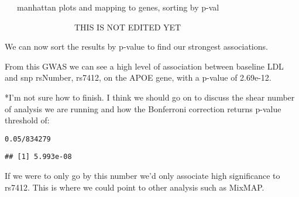 \documentclass[11pt]{article}\usepackage[]{graphicx}\usepackage[]{color}
\makeatletter
\newcommand{\hlnum}[1]{\textcolor[rgb]{0.686,0.059,0.569}{#1}}%
\newcommand{\hlopt}[1]{\textcolor[rgb]{0,0,0}{#1}}%
\newenvironment{kframe}{%
 \def\at@end@of@kframe{}%
 \ifinner\ifhmode%
  \def\at@end@of@kframe{\end{minipage}}%
  \begin{minipage}{\columnwidth}%
 \fi\fi%
 \def\FrameCommand##1{\hskip\@totalleftmargin \hskip-\fboxsep
 \colorbox{shadecolor}{##1}\hskip-\fboxsep
     \hskip-\linewidth \hskip-\@totalleftmargin \hskip\columnwidth}%
 \MakeFramed {\advance\hsize-\width
   \@totalleftmargin\z@ \linewidth\hsize
   \@setminipage}}%
 {\par\unskip\endMakeFramed%
 \at@end@of@kframe}
\newenvironment{knitrout}{}{} %
\makeatother
\begin{document}
~~~manhattan plots and mapping to genes, sorting by p-val



\newpage

~~~~~~~~~~~~~~~~~THIS IS NOT EDITED YET~~~~~~~~~~~~~~~~~~~~~

We can now sort the results by p-value to find our strongest associations.


From this GWAS we can see a high level of association between baseline LDL and snp rsNumber, rs7412, on the APOE gene, with a p-value of 2.69e-12.

*I'm not sure how to finish.  I think we should go on to discuss the shear number of analysis we are running and how the Bonferroni correction returns p-value threshold of:
\begin{knitrout}
\color{fgcolor}\begin{kframe}
\begin{alltt}
\hlnum{0.05}\hlopt{/}\hlnum{834279}
\end{alltt}
\begin{verbatim}
## [1] 5.993e-08
\end{verbatim}
\end{kframe}
\end{knitrout}

If we were to only go by this number we'd only associate high significance to rs7412.  This is where we could point to other analysis such as MixMAP.
                                              
\end{document}
